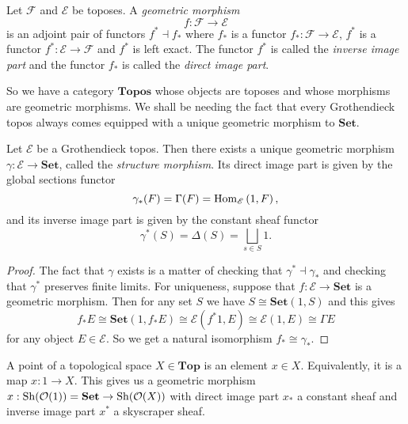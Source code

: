 \begin{definition}
\label{def:geometric morphism}
Let $\mathscr{F}$ and $\mathscr{E}$ be toposes. A \emph{geometric morphism} 
\[ f : \mathscr{F} \to \mathscr{E} \]
is an adjoint pair of functors $f^* \dashv f_*$ where $f_*$ is a functor $f_* : \mathscr{F} \to \mathscr{E}$, $f^*$ is a functor $f^* : \mathscr{E} \to \mathscr{F}$ and $f^*$ is left exact. The functor $f^*$ is called the \emph{inverse image part}  and the functor $f_*$ is called the \emph{direct image part}. 
\end{definition}

So we have a category $\mathbf{Topos}$ whose objects are toposes and whose morphisms are geometric morphisms. We shall be needing the fact that every Grothendieck topos always comes equipped with a unique geometric morphism to $\mathbf{Set}$.

\begin{proposition}
\label{prop:the structure morphism of a Grothendieck topos is unique}
Let $\mathscr{E}$ be a Grothendieck topos. Then there exists a unique geometric morphism $\gamma : \mathscr{E} \to \mathbf{Set}$, called the \emph{structure morphism}.  Its direct image part is given by the global sections functor
\[ \gamma_*(F) = \Gamma(F) = \operatorname{Hom}_{\mathscr{E}}\left(1, F \right), \]
and its inverse image part is given by the constant sheaf functor
\[ \gamma^*(S) = \Delta(S) = \bigsqcup_{s \in S}1. \]
\end{proposition}
\begin{proof}
The fact that $\gamma$ exists is a matter of checking that $\gamma^* \dashv \gamma_*$ and checking that $\gamma^*$ preserves finite limits. For uniqueness, suppose that $f : \mathscr{E} \to \mathbf{Set}$ is a geometric morphism. Then for any set $S$ we have $S \cong \mathbf{Set}(1, S)$ and this gives
\[ f_* E \cong \mathbf{Set}(1, f_* E) \cong \mathscr{E}(f^*1, E) \cong \mathscr{E}(1, E) \cong \Gamma E \]
for any object $E \in \mathscr{E}$. So we get a natural isomorphism $f_* \cong \gamma_*$.
\end{proof}

A point of a topological space $X \in \mathbf{Top}$ is an element $x \in X$. Equivalently, it is a map $x : 1 \to X$. This gives us a geometric morphism $x : \operatorname{Sh}(\mathcal{O}(1)) = \mathbf{Set} \to \operatorname{Sh}(\mathcal{O}(X))$ with direct image part $x_*$ a constant sheaf and inverse image part $x^*$ a skyscraper sheaf.

